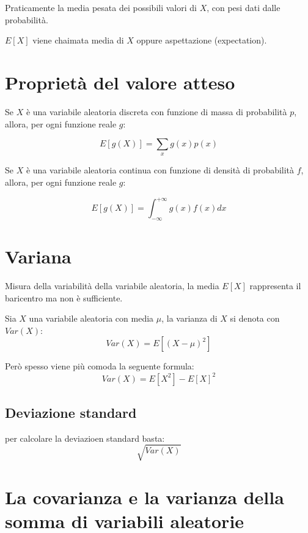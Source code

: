 Praticamente la media pesata dei possibili valori di $X$, con pesi dati dalle probabilit\`{a}. 

$E[X]$ viene chaimata media di $X$ oppure aspettazione (expectation). 


\section{Proprietà del valore atteso}

Se $X$ è una variabile aleatoria discreta con funzione di massa di probabilità $p$, allora, per ogni 
funzione reale $g$:

\begin{equation}
    E[g(X)] = \displaystyle\sum_{x} g(x)p(x) 
\end{equation}


Se $X$ è una variabile aleatoria continua con funzione di densità di probabilità $f$, allora, per ogni 
funzione reale $g$:

\begin{equation}
    E[g(X)] = \displaystyle\int_{-\infty}^{+\infty} g(x)f(x)dx 
\end{equation}


\section{Variana}

Misura della variabilità della variabile aleatoria, la media $E[X]$ rappresenta il baricentro ma non 
è sufficiente. 

Sia $X$ una variabile aleatoria con media $\mu$, la varianza di $X$ si denota con $Var(X)$:
\begin{equation}
    Var(X) = E[(X-\mu)^2] 
\end{equation}


Però spesso viene più comoda la seguente formula:
\begin{equation}
    Var(X) = E[X^2] - E[X]^2 
\end{equation}




\subsection{Deviazione standard}
per calcolare la deviazioen standard basta:
\begin{equation}
    \sqrt{Var(X)} 
\end{equation}


\section{La covarianza e la varianza della somma di variabili aleatorie}

